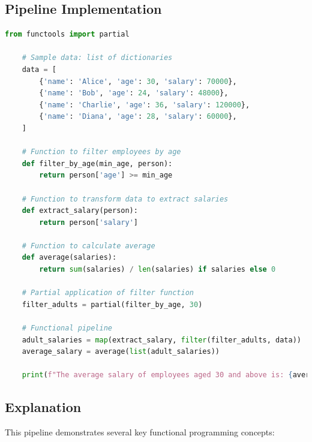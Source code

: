 \documentclass[a4paper]{article}
\begin{document}
\subsection{Pipeline Implementation}

\begin{lstlisting}[language=Python, caption=Functional Data Processing Pipeline]
    from functools import partial

    # Sample data: list of dictionaries
    data = [
        {'name': 'Alice', 'age': 30, 'salary': 70000},
        {'name': 'Bob', 'age': 24, 'salary': 48000},
        {'name': 'Charlie', 'age': 36, 'salary': 120000},
        {'name': 'Diana', 'age': 28, 'salary': 60000},
    ]

    # Function to filter employees by age
    def filter_by_age(min_age, person):
        return person['age'] >= min_age

    # Function to transform data to extract salaries
    def extract_salary(person):
        return person['salary']

    # Function to calculate average
    def average(salaries):
        return sum(salaries) / len(salaries) if salaries else 0

    # Partial application of filter function
    filter_adults = partial(filter_by_age, 30)

    # Functional pipeline
    adult_salaries = map(extract_salary, filter(filter_adults, data))
    average_salary = average(list(adult_salaries))

    print(f"The average salary of employees aged 30 and above is: {average_salary}")
\end{lstlisting}

\subsection{Explanation}
This pipeline demonstrates several key functional programming concepts:
\end{document}
